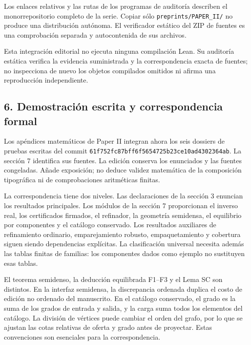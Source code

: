 \documentclass[spanish,11pt,a4paper]{article}
\begin{document}
Los enlaces relativos y las rutas de los programas de auditoría describen el monorrepositorio completo de la serie. Copiar sólo \texttt{preprints/\allowbreak{}PA\allowbreak{}PER\_\allowbreak{}II/\allowbreak{}} no produce una distribución autónoma. El verificador estático del ZIP de fuentes es una comprobación separada y autocontenida de sus archivos.

Esta integración editorial no ejecuta ninguna compilación Lean. Su auditoría estática verifica la evidencia suministrada y la correspondencia exacta de fuentes; no inspecciona de nuevo los objetos compilados omitidos ni afirma una reproducción independiente.

\subsection{6. Demostración escrita y correspondencia formal}\label{demostraciuxf3n-escrita-y-correspondencia-formal}

Los apéndices matemáticos de Paper II integran ahora los seis dossiers de pruebas escritas del commit \texttt{61f752fc\allowbreak{}87bf\allowbreak{}f6f5\allowbreak{}654725b2\allowbreak{}\allowbreak{}3ce10ad4\allowbreak{}3023\allowbreak{}64ab\allowbreak{}}. La sección 7 identifica sus fuentes. La edición conserva los enunciados y las fuentes congeladas. Añade exposición; no deduce validez matemática de la composición tipográfica ni de comprobaciones aritméticas finitas.

La correspondencia tiene dos niveles. Las declaraciones de la sección 3 enuncian los resultados principales. Los módulos de la sección 7 proporcionan el inverso real, los certificados firmados, el refinador, la geometría semidensa, el equilibrio por componentes y el catálogo conservado. Los resultados auxiliares de refinamiento ordinario, emparejamiento robusto, empaquetamiento y cobertura siguen siendo dependencias explícitas. La clasificación universal necesita además las tablas finitas de familias: los componentes dados como ejemplo no sustituyen esas tablas.

El teorema semidenso, la deducción equilibrada F1--F3 y el Lema SC son distintos. En la interfaz semidensa, la discrepancia ordenada duplica el costo de edición no ordenado del manuscrito. En el catálogo conservado, el grado es la suma de los grados de entrada y salida, y la carga suma todos los elementos del catálogo. La división de vértices puede cambiar el orden del grafo, por lo que se ajustan las cotas relativas de oferta y grado antes de proyectar. Estas convenciones son esenciales para la correspondencia.
\end{document}
